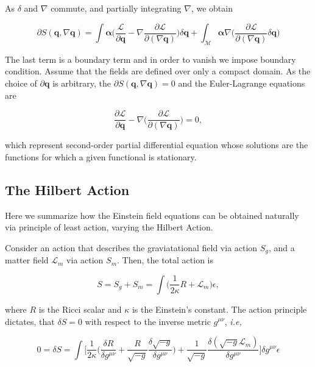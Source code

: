 \documentclass[11pt,a4paper,headinclude=true,DIV=14,BCOR=8mm,chapterprefix,listof=totoc,twoside,openright,abstracton]{scrbook}
\begin{document}
As $\delta$ and $\nabla$ commute, and partially integrating $\nabla$, we obtain

\begin{equation}
\partial S(\boldsymbol{q}, \nabla\boldsymbol{q}) = \int\boldsymbol{\alpha}\Big(\frac{\mathcal{L}}{\partial\boldsymbol{q}}-\nabla\frac{\partial \mathcal{L}}{\partial(\nabla\boldsymbol{q})}\Big)\delta\boldsymbol{q} + \int_{\mathcal{M}}\boldsymbol{\alpha}\nabla\Big(\frac{\partial\mathcal{L}}{\partial(\nabla\boldsymbol{q})}\delta\boldsymbol{q}\Big)
\end{equation}

The last term is a boundary term and in order to vanish we impose boundary condition. Assume that the fields are defined over only a compact domain. As the choice of $\partial\boldsymbol{q}$ is arbitrary, the $ \partial S(\boldsymbol{q}, \nabla\boldsymbol{q}) = 0 $ and the Euler-Lagrange equations are

\begin{equation}
\frac{\partial \mathcal{L}}{\partial\boldsymbol{q}} - \nabla\Big(\frac{\partial\mathcal{L}}{\partial(\nabla\boldsymbol{q})}\Big) = 0,
\label{eq:theory:eulerlagrange}
\end{equation}

which represent second-order partial differential equation whose solutions are the functions for which a given functional is stationary.


\subsection{The Hilbert Action}

Here we summarize how the Einstein field equations can be obtained naturally via principle of least action, varying the Hilbert Action.

Consider an action that describes the graviatational field via action $S_g$, and a matter field $\mathcal{L}_m$ via action $S_m$. Then, the total action is

\begin{equation}
    S = S_g + S_m = \int\Big(\frac{1}{2\kappa}R+\mathcal{L}_m\Big)\epsilon,
\end{equation}

where $R$ is the Ricci scalar and $\kappa$ is the Einstein's constant. 
The action principle dictates, that $\delta S = 0$  with respect to the inverse metric $g^{\mu\nu}$, \textit{i.e,}

\begin{equation}
0 = \delta S = \int\Bigg[\frac{1}{2\kappa}\Big(\frac{\delta R}{\delta g^{\mu\nu}}+\frac{R}{\sqrt{-g}}\frac{\delta\sqrt{-g}}{\delta g^{\mu\nu}}\Big) + \frac{1}{\sqrt{-g}}\frac{\delta(\sqrt{-g}\mathcal{L}_m)}{\delta g^{\mu\nu}}\Bigg]\delta g^{\mu\nu}\epsilon
\end{equation}
\end{document}
